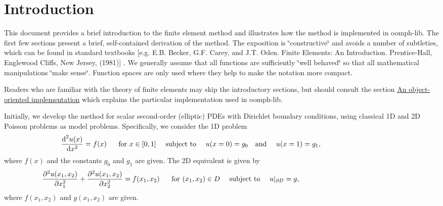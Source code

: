 \hypertarget{index_intro}{}\section{Introduction}\label{index_intro}
This document provides a brief introduction to the finite element method and illustrates how the method is implemented in {\ttfamily oomph-\/lib}. The first few sections present a brief, self-\/contained derivation of the method. The exposition is \char`\"{}constructive\char`\"{} and avoids a number of subtleties, which can be found in standard textbooks \mbox{[}e.\-g. E.\-B. Becker, G.\-F. Carey, and J.\-T. Oden. Finite Elements\-: An Introduction. Prentice-\/\-Hall, Englewood Cliffs, New Jersey, (1981)\mbox{]} . We generally assume that all functions are sufficiently \char`\"{}well behaved\char`\"{} so that all mathematical manipulations \char`\"{}make sense\char`\"{}. Function spaces are only used where they help to make the notation more compact.

Readers who are familiar with the theory of finite elements may skip the introductory sections, but should consult the section \hyperlink{index_towards_oo}{An object-\/oriented implementation} which explains the particular implementation used in {\ttfamily oomph-\/lib}.

Initially, we develop the method for scalar second-\/order (elliptic) P\-D\-Es with Dirichlet boundary conditions, using classical 1\-D and 2\-D Poisson problems as model problems. Specifically, we consider the 1\-D problem \[ \frac{\mbox{d}^2 u(x)}{\mbox{d} x^2} = f(x) \mbox{ \ \ \ \ for $x\in[0,1]$ \ \ \ subject to \ \ \ } u(x=0)= g_0 \mbox{\ \ \ and \ \ \ } u(x=1)= g_1, \mbox{\hspace{3cm}} \] where $ f(x)$ and the constants $g_0$ and $g_1$ are given. The 2\-D equivalent is given by \[ \frac{\partial^2 u(x_1,x_2)}{\partial x_1^{2}} + \frac{\partial^{2} u(x_1,x_2)}{\partial x_2^{2}} = f(x_1,x_2) \mbox{ \ \ \ \ for $(x_1,x_2)\in D$ \ \ \ subject to \ \ \ } u|_{\partial D} = g, \mbox{\hspace{5cm}} \] where $ f(x_1,x_2)$ and $ g(x_1,x_2)$ are given.

